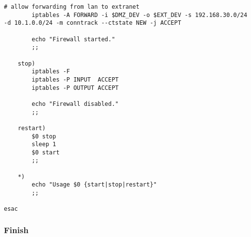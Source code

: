 \begin{lstlisting}[label=lst:masq,caption={Masquerading.}]
        # allow forwarding from lan to extranet
        iptables -A FORWARD -i $DMZ_DEV -o $EXT_DEV -s 192.168.30.0/24 -d 10.1.0.0/24 -m conntrack --ctstate NEW -j ACCEPT

        echo "Firewall started."
        ;;

    stop)
        iptables -F
        iptables -P INPUT  ACCEPT
        iptables -P OUTPUT ACCEPT

        echo "Firewall disabled."
        ;;

    restart)
        $0 stop
        sleep 1
        $0 start
        ;;

    *)
        echo "Usage $0 {start|stop|restart}"
        ;;

esac
\end{lstlisting}


\subsubsection{Finish}

